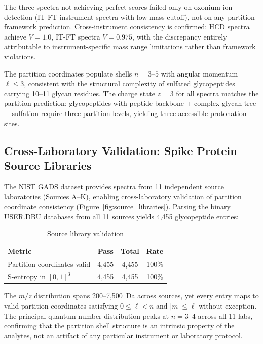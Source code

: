 \documentclass[twocolumn,10pt,a4paper]{article}
\theoremstyle{definition}
\theoremstyle{remark}
\begin{document}
The three spectra not achieving perfect scores failed only on oxonium ion detection (IT-FT instrument spectra with low-mass cutoff), not on any partition framework prediction. Cross-instrument consistency is confirmed: HCD spectra achieve $\bar{V} = 1.0$, IT-FT spectra $\bar{V} = 0.975$, with the discrepancy entirely attributable to instrument-specific mass range limitations rather than framework violations.

The partition coordinates populate shells $n = 3$--$5$ with angular momentum $\ell \leq 3$, consistent with the structural complexity of sulfated glycopeptides carrying 10--11 glycan residues. The charge state $z = 3$ for all spectra matches the partition prediction: glycopeptides with peptide backbone + complex glycan tree + sulfation require three partition levels, yielding three accessible protonation sites.

\subsection{Cross-Laboratory Validation: Spike Protein Source Libraries}
\label{sec:sources}

The NIST GADS dataset provides spectra from 11 independent source laboratories (Sources A--K), enabling cross-laboratory validation of partition coordinate consistency (Figure~\ref{fig:source_libraries}). Parsing the binary USER.DBU databases from all 11 sources yields 4,455 glycopeptide entries:

\begin{table}[H]
\centering
\caption{Source library validation}
\label{tab:sources}
\small
\begin{tabular}{lccc}
\toprule
\textbf{Metric} & \textbf{Pass} & \textbf{Total} & \textbf{Rate} \\
\midrule
Partition coordinates valid & 4,455 & 4,455 & 100\% \\
S-entropy in $[0,1]^3$ & 4,455 & 4,455 & 100\% \\
\bottomrule
\end{tabular}
\end{table}

The $m/z$ distribution spans 200--7,500~Da across sources, yet every entry maps to valid partition coordinates satisfying $0 \leq \ell < n$ and $|m| \leq \ell$ without exception. The principal quantum number distribution peaks at $n = 3$--$4$ across all 11 labs, confirming that the partition shell structure is an intrinsic property of the analytes, not an artifact of any particular instrument or laboratory protocol.
\end{document}
